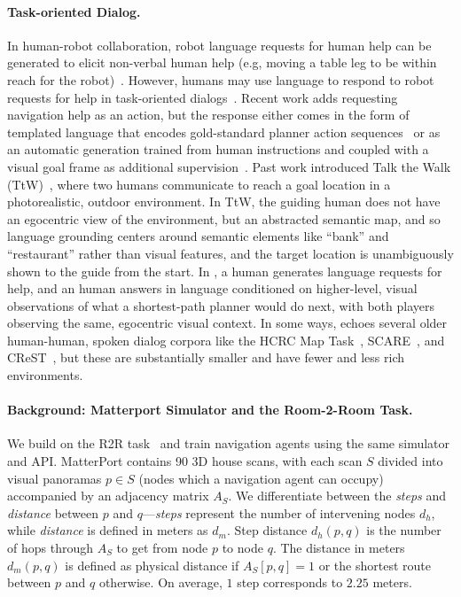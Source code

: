 \paragraph{Task-oriented Dialog.}
In human-robot collaboration, robot language requests for human help can be generated to elicit non-verbal human help (e.g, moving a table leg to be within reach for the robot)~\cite{tellex:rss14}.
However, humans may use language to respond to robot requests for help in task-oriented dialogs~\cite{thomason:icra19,williams:auro19,marge:naacl19}.
Recent work adds requesting navigation help as an action, but the response either comes in the form of templated language that encodes gold-standard planner action sequences~\cite{nguyen:cvpr19} or as an automatic generation trained from human instructions and coupled with a visual goal frame as additional supervision~\cite{nguyen:emnlp19}.
Past work introduced Talk the Walk (TtW)~\cite{devries:arxiv18}, where two humans communicate to reach a goal location in a photorealistic, outdoor environment.
In TtW, the guiding human does not have an egocentric view of the environment, but an abstracted semantic map, and so language grounding centers around semantic elements like ``bank'' and ``restaurant'' rather than visual features, and the target location is unambiguously shown to the guide from the start.
In \dataset{}, a \nav{} human generates language requests for help, and an \ora{} human answers in language conditioned on higher-level, visual observations of what a shortest-path planner would do next, with both players observing the same, egocentric visual context.
In some ways, \dataset{} echoes several older human-human, spoken dialog corpora like the HCRC Map Task~\cite{anderson:ls91}, SCARE~\cite{stoia:lrec08}, and CReST~\cite{eberhard:lrec10}, but these are substantially smaller and have fewer and less rich environments.

\paragraph{Background: Matterport Simulator and the Room-2-Room Task.}
We build on the R2R task~\cite{anderson:cvpr18} and train navigation agents using the same simulator and API.
MatterPort contains 90 3D house scans, with each scan $S$ divided into visual panoramas $p\in S$ (nodes which a navigation agent can occupy) accompanied by an adjacency matrix $A_S$.
We differentiate between the \textit{steps} and \textit{distance} between $p$ and $q$---\textit{steps} represent the number of intervening nodes $d_h$, while \textit{distance} is defined in meters as $d_m$.
Step distance $d_h(p, q)$ is the number of hops through $A_S$ to get from node $p$ to node $q$.
The distance in meters $d_m(p, q)$ is defined as physical distance if $A_S[p,q] = 1$ or the shortest route between $p$ and $q$ otherwise.
On average, $1$ step corresponds to $2.25$ meters.

